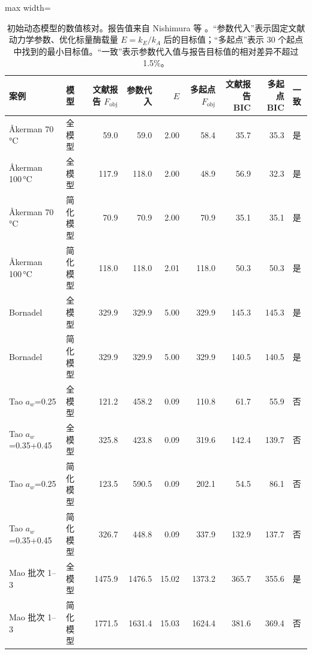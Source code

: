 \begin{table}[t]
\centering
\caption{初始动态模型的数值核对。报告值来自 Nishimura 等 \cite{nishimura2026}。“参数代入”表示固定文献动力学参数、优化标量酶载量 $E=k_E/k_A$ 后的目标值；“多起点”表示 30 个起点中找到的最小目标值。“一致”表示参数代入值与报告目标值的相对差异不超过 1.5\%。}\label{tab:reprodyn}
\footnotesize
\begin{adjustbox}{max width=\linewidth}
\begin{tabular}{llrrrrrrl}
\toprule
案例 & 模型 & 文献报告 $F_\mathrm{obj}$ & 参数代入 & $E$ & 多起点 $F_\mathrm{obj}$ & 文献报告 BIC & 多起点 BIC & 一致 \\
\midrule
Åkerman 70\,°C & 全模型 & 59.0 & 59.0 & 2.00 & 58.4 & 35.7 & 35.3 & 是 \\
Åkerman 100\,°C & 全模型 & 117.9 & 118.0 & 2.00 & 48.9 & 56.9 & 32.3 & 是 \\
Åkerman 70\,°C & 简化模型 & 70.9 & 70.9 & 2.00 & 70.9 & 35.1 & 35.1 & 是 \\
Åkerman 100\,°C & 简化模型 & 118.0 & 118.0 & 2.01 & 118.0 & 50.3 & 50.3 & 是 \\
Bornadel & 全模型 & 329.9 & 329.9 & 5.00 & 329.9 & 145.3 & 145.3 & 是 \\
Bornadel & 简化模型 & 329.9 & 329.9 & 5.00 & 329.9 & 140.5 & 140.5 & 是 \\
Tao $a_w$=0.25 & 全模型 & 121.2 & 458.2 & 0.09 & 110.8 & 61.7 & 55.9 & 否 \\
Tao $a_w$=0.35+0.45 & 全模型 & 325.8 & 423.8 & 0.09 & 319.6 & 142.4 & 139.7 & 否 \\
Tao $a_w$=0.25 & 简化模型 & 123.5 & 590.5 & 0.09 & 202.1 & 54.5 & 86.1 & 否 \\
Tao $a_w$=0.35+0.45 & 简化模型 & 326.7 & 448.8 & 0.09 & 337.9 & 132.9 & 137.7 & 否 \\
Mao 批次 1--3 & 全模型 & 1475.9 & 1476.5 & 15.02 & 1373.2 & 365.7 & 355.6 & 是 \\
Mao 批次 1--3 & 简化模型 & 1771.5 & 1631.4 & 15.03 & 1624.4 & 381.6 & 369.4 & 否 \\
\bottomrule
\end{tabular}
\end{adjustbox}
\end{table}
